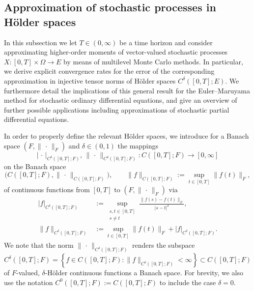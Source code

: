 \documentclass[reqno]{amsart}
\numberwithin{equation}{section}
\newcommand{\norm}[2]{     \| #1       \|_{ #2 }}
\newcommand{\seminorm}[2]{  | #1        |_{ #2 }}
\newcommand{\from}{\colon}
\theoremstyle{remark}
\theoremstyle{definition}
\begin{document}
\subsection{Approximation of stochastic processes in H\"older spaces}
\label{subsec:appl-hoelder}

In this subsection we let $T \in (0,\infty)$ 
be a time horizon and consider   
approximating higher-order moments of 
vector-valued stochastic processes 
${X\from [0,T]\times \Omega \to E}$ 
by means of multilevel Monte Carlo methods. 
In particular, we derive explicit convergence rates  
for the error of the corresponding approximation 
in injective tensor norms of H\"older spaces 
$C^\delta([0,T];E)$.  
We furthermore detail the implications 
of this general result 
for the Euler--Maruyama 
method for stochastic ordinary differential equations, 
and give an overview of further possible applications 
including approximations of 
stochastic partial differential equations. 

In order to properly define the relevant H\"older spaces, 
we introduce for a Banach space $(F,\norm{\,\cdot\,}{F})$ 
and $\delta \in (0,1)$ the mappings 
%
\[
\seminorm{\,\cdot\,}{C^\delta([0,T];F)}, \,
\norm{\,\cdot\,}{C^\delta([0,T];F)}
\from C([0,T];F) \to [0,\infty] 
\]
%
on the Banach space 
%
\[
\bigl( C([0,T];F), \norm{\,\cdot\,}{C([0,T];F)} \bigr), 
\qquad 
\norm{f}{C([0,T];F)} 
:= 
\sup_{t \in [0,T]} \norm{f(t)}{F}, 
\]
%
of continuous 
functions from $[0,T]$ to 
$(F,\norm{\,\cdot\,}{F})$
via 
% 
\begin{align*}
\seminorm{f}{C^\delta([0,T];F)}
&:=  
\sup_{\substack{s,t\in [0,T] \\ s\neq t}} \frac{\norm{f(s)-f(t)}{F}}{|s-t|^{\delta}}, 
\\
\norm{f}{C^\delta([0,T];F)}
&:=  
\sup_{t \in [0,T]} \norm{f(t)}{F} 
+ 
\seminorm{f}{C^\delta([0,T];F)} . 
\end{align*} 
%
We note that the norm 
$\norm{\,\cdot\,}{C^\delta([0,T];F)}$ 
renders the subspace 
%
\[ 
C^{\delta}([0,T];F) 
= 
\left\{ f \in C([0,T];F) : 
\norm{f}{C^{\delta}([0,T];F)} < \infty \right\}
\subset 
C([0,T];F) 
\] 
%
of $F$-valued, 
$\delta$-H\"older continuous 
functions a Banach space. 
For brevity, we also use the 
notation $C^0([0,T];F) := C([0,T];F)$ 
to include the case $\delta=0$. 
\end{document}

